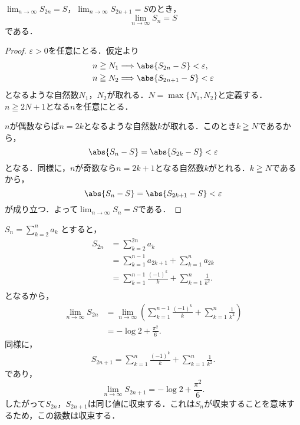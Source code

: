 
\begin{lemma}{}{}
    $\lim_{n \to \infty} S_{2n}=S$，$\lim_{n \to \infty} S_{2n+1}=S$のとき，
    \[
        \lim_{n \to \infty} S_n = S
    \]
    である．
\end{lemma}
\begin{proof}
    $\varepsilon >0$を任意にとる．仮定より
    \begin{align*}
         & n \geqq N_1 \Longrightarrow \abs{S_{2n}-S} < \varepsilon,  \\
         & n \geqq N_2 \Longrightarrow \abs{S_{2n+1}-S} < \varepsilon
    \end{align*}
    となるような自然数$N_1$，$N_2$が取れる．$N=\max\{N_1, N_2\}$と定義する．$n \geqq 2N +1$となる$n$を任意にとる．

    $n$が偶数ならば$n =2k$となるような自然数$k$が取れる．このとき$k \geqq N$であるから，
    \[
        \abs{S_n -S}=\abs{S_{2k}-S}<\varepsilon
    \]
    となる．同様に，$n$が奇数なら$n =2k+1$となる自然数$k$がとれる．$k \geqq N$であるから，
    \[
        \abs{S_n -S}=\abs{S_{2k+1}-S}<\varepsilon
    \]
    が成り立つ．よって$\lim_{n \to \infty} S_n =S$である．
\end{proof}

\begin{tanswer}
    $S_{n} = \sum ^{n}_{k=2} a_k$ とすると，
    \begin{align*}
        S_{2n} & = \sum ^{2n}_{k=2} a_{k}                                              \\
               & = \sum ^{n-1}_{k=1} a_{2k+1} + \sum ^{n}_{k=1} a_{2k}                 \\
               & = \sum ^{n-1}_{k=1} \frac{(-1)^k}{k} + \sum ^{n}_{k=1} \frac{1}{k^2}. \\
    \end{align*}
    となるから，
    \begin{align*}
        \lim_{n \to \infty} S_{2n} & =\lim_{n \to \infty} \left (\sum ^{n-1}_{k=1} \frac{(-1)^k}{k} + \sum ^{n}_{k=1} \frac{1}{k^2} \right ) \\
                                   & = -\log 2 + \frac{\pi^2}{6}.
    \end{align*}
    同様に，
    \begin{align*}
        S_{2n+1} = \sum ^{n}_{k=1} \frac{(-1)^k}{k} + \sum ^{n}_{k=1} \frac{1}{k^2}.
    \end{align*}
    であり，
    \[
        \lim_{n \to \infty} S_{2n+1} = -\log 2 + \frac{\pi^2}{6}.
    \]
    したがって$S_{2n}$，$S_{2n+1}$は同じ値に収束する．これは$S_{n}$が収束することを意味するため，この級数は収束する．
\end{tanswer}


